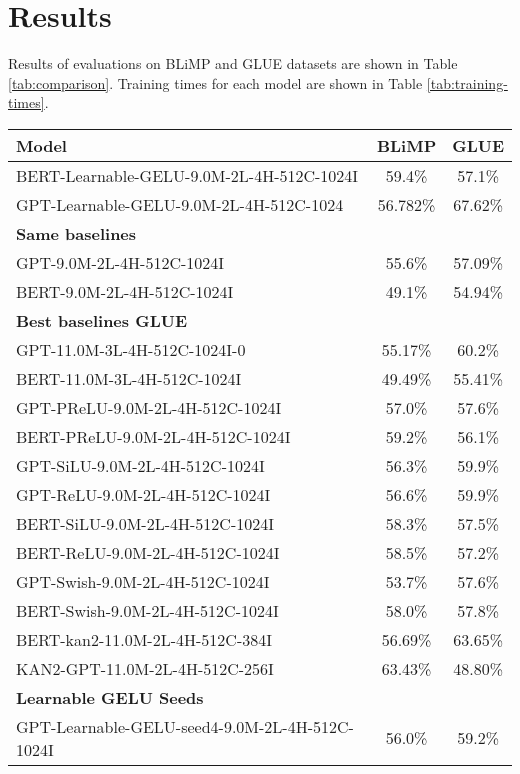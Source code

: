 \section{Results} %
Results of evaluations on BLiMP and GLUE datasets are shown in Table \ref{tab:comparison}. Training times for each model are shown in Table \ref{tab:training-times}.
\begin{table*}[h]
    \centering
    \begin{tabular}{lcc}
    \hline
    \textbf{Model} & \textbf{BLiMP} & \textbf{GLUE} \\
    \hline
    BERT-Learnable-GELU-9.0M-2L-4H-512C-1024I & 59.4\% & 57.1\% \\
    GPT-Learnable-GELU-9.0M-2L-4H-512C-1024   & 56.782\% & 67.62\% \\
    \hline
    \multicolumn{3}{l}{\textbf{Same baselines}} \\
    GPT-9.0M-2L-4H-512C-1024I & 55.6\% & 57.09\% \\
    BERT-9.0M-2L-4H-512C-1024I & 49.1\% & 54.94\% \\
    \hline
    \multicolumn{3}{l}{\textbf{Best baselines GLUE}} \\
    GPT-11.0M-3L-4H-512C-1024I-0 & 55.17\% & 60.2\% \\
    BERT-11.0M-3L-4H-512C-1024I & 49.49\% & 55.41\% \\
    \hline
    GPT-PReLU-9.0M-2L-4H-512C-1024I & 57.0\% & 57.6\% \\
    BERT-PReLU-9.0M-2L-4H-512C-1024I & 59.2\% & 56.1\% \\
    GPT-SiLU-9.0M-2L-4H-512C-1024I & 56.3\% & 59.9\% \\
    GPT-ReLU-9.0M-2L-4H-512C-1024I & 56.6\% & 59.9\% \\
    BERT-SiLU-9.0M-2L-4H-512C-1024I & 58.3\% & 57.5\% \\
    BERT-ReLU-9.0M-2L-4H-512C-1024I & 58.5\% & 57.2\% \\
    GPT-Swish-9.0M-2L-4H-512C-1024I & 53.7\% & 57.6\%\\
    BERT-Swish-9.0M-2L-4H-512C-1024I & 58.0\% & 57.8\% \\
    BERT-kan2-11.0M-2L-4H-512C-384I & 56.69\% & 63.65\% \\
    KAN2-GPT-11.0M-2L-4H-512C-256I & 63.43\% & 48.80\% \\
    \hline
    \multicolumn{3}{l}{\textbf{Learnable GELU Seeds}} \\
    GPT-Learnable-GELU-seed4-9.0M-2L-4H-512C-1024I & 56.0\% & 59.2\% \\

\end{tabular}
\end{table*}
